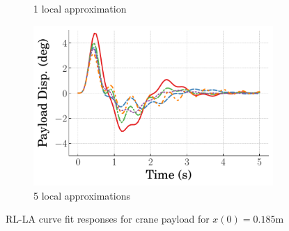 \begin{figure}
\begin{subfigure}[b]{0.32\textwidth}
        \caption{1 local approximation}
        \label{subfig_chap5:dpcrane_RL_LA_payload_0.185_init_curve_fit_1_bins_unclipped}
    \end{subfigure}
    \hfill
    \begin{subfigure}[b]{0.32\textwidth}
        \centering
        \includegraphics[width=\textwidth]{figures/figures_Interpretability/Mean_ISE_dpcrane_cubic_5_bins/curve_fit_time_responses/RL_LA/curve_fit_0p18_Payload_Disp.pdf} 
        \caption{5 local approximations}
        \label{subfig_chap5:dpcrane_RL_LA_payload_0.185_init_curve_fit_5_bins_unclipped}
    \end{subfigure}
    \hfill
    \caption{RL-LA curve fit responses for crane payload for $x(0)=0.185\si{\meter}$}
    \label{fig_chap5:dpcrane_RL_LA_payload_0.185_init_unclipped}
\end{figure}
%

